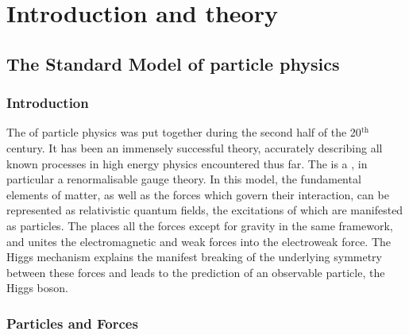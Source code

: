 \chapter{Introduction and theory}
\label{chap:theory}

\section{The Standard Model of particle physics}
\subsection{Introduction}

The \SM of particle physics was put together during the second half of the 20$^{\text{th}}$ century. It has been an immensely successful theory, accurately describing all known processes in high energy physics encountered thus far. The \SM is a \QFT, in particular a renormalisable gauge theory. In this model, the fundamental elements of matter, as well as the forces which govern their interaction, can be represented as relativistic quantum fields, the excitations of which are manifested as particles. The \SM places all the forces except for gravity in the same framework, and unites the electromagnetic and weak forces into the electroweak force. The Higgs mechanism explains the manifest breaking of the underlying symmetry between these forces and leads to the prediction of an observable particle, the Higgs boson. %




\subsection{Particles and Forces}


